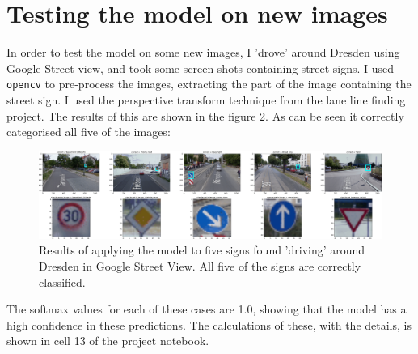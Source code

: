 \documentclass[letterpaper,12pt]{article}
\begin{document}
\section{Testing the model on new images}
In order to test the model on some new images, I 'drove' around Dresden using Google Street view, and took some screen-shots containing street signs. I used \texttt{opencv} to pre-process the images, extracting the part of the image containing the street sign. I used the perspective transform technique from the lane line finding project. The results of this are shown in the figure 2. As can be seen it correctly categorised all five of the images:
\begin{figure}
\includegraphics[scale=0.2]{results/new.pdf}
\caption{Results of applying the model to five signs found 'driving' around Dresden in Google Street View. All five of the signs are correctly classified. }
\end{figure}
The softmax values for each of these cases are 1.0, showing that the model has a high confidence in these predictions. The calculations of these, with the details, is shown in cell 13 of the project notebook.
\end{document}
